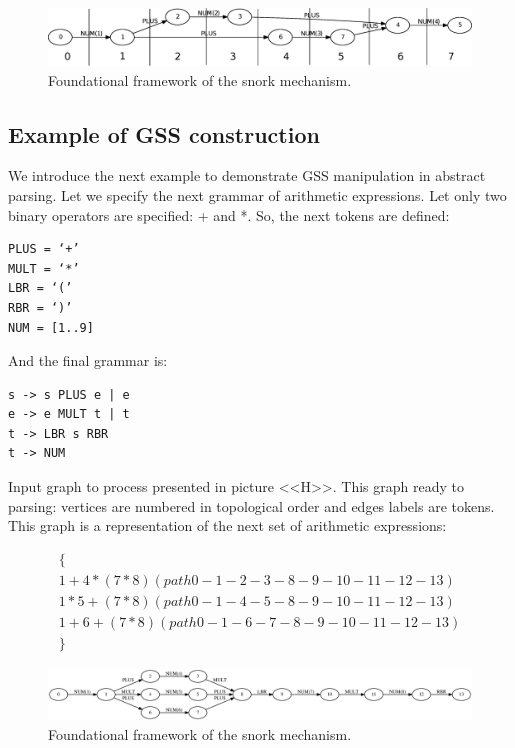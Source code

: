 \documentclass{sigplanconf}
\begin{document}
\begin{figure}
    \begin{center}
        \includegraphics[scale=0.25]{Graphs/toposort1.eps}
    \end{center}
    \caption{Foundational framework of the snork mechanism.}
    \label{fig-ffsm}
\end{figure}

\subsection{Example of GSS construction}
We introduce the next example to demonstrate GSS manipulation in abstract parsing. Let we specify the next grammar of arithmetic expressions. Let only two binary operators are specified:  + and *. So, the next tokens are defined:
\begin{verbatim}
PLUS = ‘+’
MULT = ‘*’
LBR = ‘(’
RBR = ‘)’
NUM = [1..9]
\end{verbatim}

And the final grammar is:

\begin{verbatim}
s -> s PLUS e | e
e -> e MULT t | t
t -> LBR s RBR
t -> NUM
\end{verbatim}

Input graph to process presented in picture <<H>>. This graph ready to parsing: vertices are numbered in topological order and edges labels are tokens. This graph is a representation of the next set of arithmetic expressions:

\begin{equation}
\begin{split}
\{ \\
1+4*(7*8) (path 0-1-2-3-8-9-10-11-12-13) \\
1*5+(7*8) (path 0-1-4-5-8-9-10-11-12-13) \\
1+6+(7*8) (path 0-1-6-7-8-9-10-11-12-13) \\
\}
\end{split}
\end{equation}

\begin{figure}
    \begin{center}
        \includegraphics[scale=0.4]{Graphs/input1.eps}
    \end{center}
    \caption{Foundational framework of the snork mechanism.}
    \label{fig-ffsm}
\end{figure}
\end{document}

